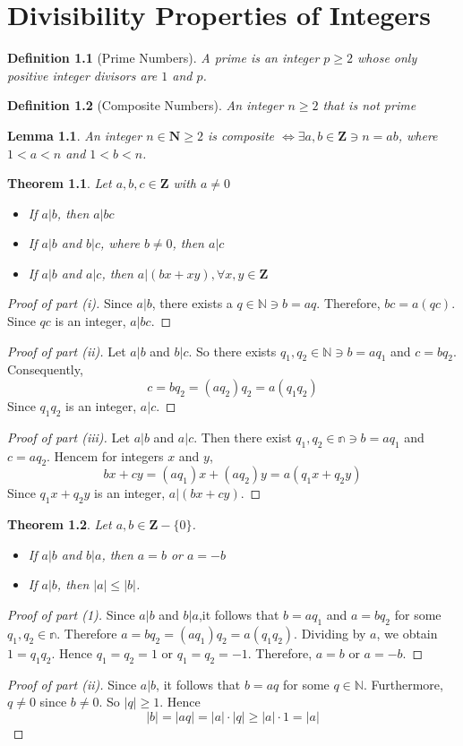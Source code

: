 \documentclass[10pt]{report}
\newtheorem{thm1}{Theorem}[chapter]
\newtheorem{lem1}{Lemma}[chapter]
\newtheorem{def1}{Definition}[chapter]
\begin{document}
\chapter{Divisibility Properties of Integers}
\begin{def1}[Prime Numbers]
A prime is an integer $p\geq 2$ whose only positive integer divisors are $1$ and $p$.
\end{def1}
\begin{def1}[Composite Numbers]
An integer $n\geq 2$ that is not prime
\end{def1}
\begin{lem1}
An integer $n\in \textbf{N}\geq 2$ is composite $\iff\exists a,b\in \textbf{Z}\ni n=ab$, where $1<a<n$ and $1<b<n$.
\end{lem1}
\begin{thm1}
Let $a, b, c\in\textbf{Z}$ with $a\neq 0$
\begin{itemize}
\item[(i)] If $a|b$, then $a|bc$
\item[(ii)]If $a|b$ and $b|c$, where $b\neq 0$, then $a|c$
\item[(iii)]If $a|b$ and $a|c$, then $a|(bx+xy), \forall x, y\in \textbf{Z}$ 
\end{itemize}
\end{thm1}
\begin{proof}[Proof of part (i)]
Since $a|b$, there exists a $q\in\mathbb{N}\ni b=aq$. Therefore, $bc=a(qc)$. Since $qc$ is an integer, $a|bc$.
\end{proof}
\begin{proof}[Proof of part (ii)]
Let $a|b$ and $b|c$. So there exists $q_1,q_2\in\mathbb{N}\ni b=aq_1$ and $c = bq_2$. Consequently,
$$c=bq_2=(aq_2)q_2=a(q_1q_2)$$
Since $q_1q_2$ is an integer, $a|c$.
\end{proof}
\begin{proof}[Proof of part (iii)]
Let $a|b$ and $a|c$. Then there exist $q_1,q_2\in\mathbb{n}\ni b=aq_1$ and $c=aq_2$. Hencem for integers $x$ and $y$,
$$bx+cy=(aq_1)x+(aq_2)y=a(q_1x+q_2y)$$
Since $q_1x+q_2y$ is an integer, $a|(bx+cy)$.
\end{proof}
\begin{thm1}
Let $a, b\in \textbf{Z}-\{0\}$.
\begin{itemize}
\item[(i)]If $a|b$ and $b|a$, then $a=b$ or $a=-b$
\item[(ii)]If $a|b$, then $|a|\leq |b|$.
\end{itemize}
\end{thm1}
\begin{proof}[Proof of part (1)]
Since $a|b$ and $b|a$,it follows that $b=aq_1$ and $a=bq_2$ for some $q_1, q_2\in\mathbb{n}$. Therefore $a=bq_2=(aq_1)q_2=a(q_1q_2)$. Dividing by $a$, we obtain $1=q_1q_2$. Hence $q_1=q_2=1$ or $q_1=q_2=-1$. Therefore, $a=b$ or $a=-b$.
\end{proof}
\begin{proof}[Proof of part (ii)]
Since $a|b$, it follows that $b=aq$ for some $q\in\mathbb{N}$. Furthermore, $q\neq 0$ since $b\neq 0$. So $|q|\geq 1$. Hence
$$|b|=|aq|=|a|\cdot |q|\geq|a|\cdot 1 = |a|$$
\end{proof}
\end{document}
